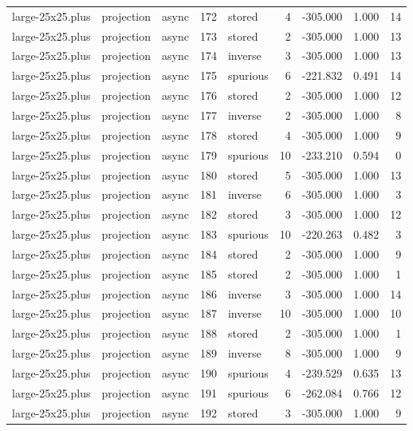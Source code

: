 \begin{tabular}{lllrlrrrr}
large-25x25.plus & projection & async & 172 & stored & 4 & -305.000 & 1.000 & 14 \\
large-25x25.plus & projection & async & 173 & stored & 2 & -305.000 & 1.000 & 13 \\
large-25x25.plus & projection & async & 174 & inverse & 3 & -305.000 & 1.000 & 13 \\
large-25x25.plus & projection & async & 175 & spurious & 6 & -221.832 & 0.491 & 14 \\
large-25x25.plus & projection & async & 176 & stored & 2 & -305.000 & 1.000 & 12 \\
large-25x25.plus & projection & async & 177 & inverse & 2 & -305.000 & 1.000 & 8 \\
large-25x25.plus & projection & async & 178 & stored & 4 & -305.000 & 1.000 & 9 \\
large-25x25.plus & projection & async & 179 & spurious & 10 & -233.210 & 0.594 & 0 \\
large-25x25.plus & projection & async & 180 & stored & 5 & -305.000 & 1.000 & 13 \\
large-25x25.plus & projection & async & 181 & inverse & 6 & -305.000 & 1.000 & 3 \\
large-25x25.plus & projection & async & 182 & stored & 3 & -305.000 & 1.000 & 12 \\
large-25x25.plus & projection & async & 183 & spurious & 10 & -220.263 & 0.482 & 3 \\
large-25x25.plus & projection & async & 184 & stored & 2 & -305.000 & 1.000 & 9 \\
large-25x25.plus & projection & async & 185 & stored & 2 & -305.000 & 1.000 & 1 \\
large-25x25.plus & projection & async & 186 & inverse & 3 & -305.000 & 1.000 & 14 \\
large-25x25.plus & projection & async & 187 & inverse & 10 & -305.000 & 1.000 & 10 \\
large-25x25.plus & projection & async & 188 & stored & 2 & -305.000 & 1.000 & 1 \\
large-25x25.plus & projection & async & 189 & inverse & 8 & -305.000 & 1.000 & 9 \\
large-25x25.plus & projection & async & 190 & spurious & 4 & -239.529 & 0.635 & 13 \\
large-25x25.plus & projection & async & 191 & spurious & 6 & -262.084 & 0.766 & 12 \\
large-25x25.plus & projection & async & 192 & stored & 3 & -305.000 & 1.000 & 9 \\

\end{tabular}
